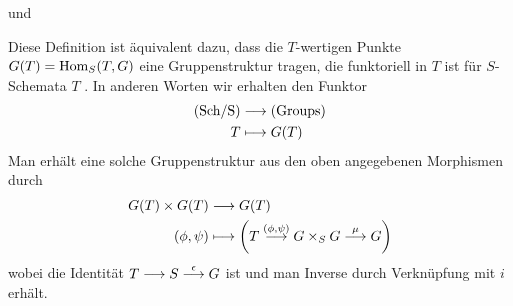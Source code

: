 \documentclass[german]{scrreprt}
\begin{document}
\begin{Definition}[$S$"=Gruppenschema]
\begin{description}[labelwidth=4cm]
    und
  \item[Assoziativität]
\end{description}
\begin{Bemerkung}
  Diese Definition ist äquivalent dazu, dass die $T$-wertigen Punkte
  $G(T)=\operatorname{Hom}_S(T,G)$ eine Gruppenstruktur tragen, die funktoriell in
  $T$ ist für $S$-Schemata $T$ \cite[Chapter (4.15)]{wedhorn}. 
  In anderen Worten wir erhalten den Funktor 
  \begin{align*}
    \text{(Sch/S)} &\longrightarrow \text{(Groups)}\\
    T &\longmapsto G(T)
  \end{align*}
  Man erhält eine solche Gruppenstruktur aus den oben angegebenen
  Morphismen durch
  \begin{align*}
    G(T)\times G(T) &\longrightarrow G(T)\\
    (\phi, \psi) &\longmapsto 
                   \left(
                   T\overset{(\phi,\psi)}{\longrightarrow} G\times_S G
                   \overset\mu{\longrightarrow} G
                   \right)
  \end{align*}
  wobei die Identität $T\longrightarrow S\overset{\epsilon}{\longrightarrow} G$ ist und
  man Inverse durch Verknüpfung mit $i$ erhält.
  \cite[Proposition IV.3.2]{silverman2}
\end{Bemerkung}


\end{Definition}
\end{document}
